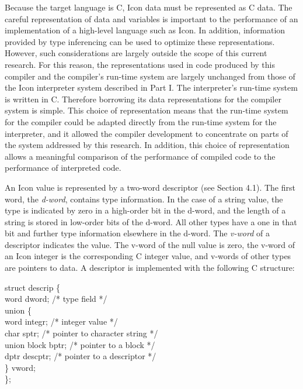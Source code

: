 Because the target language is C, Icon data must be represented as C
data. The careful representation of data and variables is important to
the performance of an implementation of a high-level language such as
Icon. In addition, information provided by type inferencing can be
used to optimize these representations. However, such considerations
are largely outside the scope of this current research. For this
reason, the representations used in code produced by this compiler and
the compiler's run-time system are largely unchanged from those of the
Icon interpreter system described in Part I. The interpreter's
run-time system is written in C. Therefore borrowing its data
representations for the compiler system is simple. This choice of
representation means that the run-time system for the compiler could
be adapted directly from the run-time system for the interpreter, and
it allowed the compiler development to concentrate on parts of the
system addressed by this research. In addition, this choice of
representation allows a meaningful comparison of the performance of
compiled code to the performance of interpreted code.


An Icon value is represented by a two-word descriptor (see Section
4.1). The first word, the \textit{d-word}, contains type
information. In the case of a string value, the type is indicated by
zero in a high-order bit in the d-word, and the length of a string is
stored in low-order bits of the d-word. All other types have a one in
that bit and further type information elsewhere in the d-word. The
\textit{v-word} of a descriptor indicates the value. The v-word of the
null value is zero, the v-word of an Icon integer is the corresponding
C integer value, and v-words of other types are pointers to data. A
descriptor is implemented with the following C structure:

\goodbreak
\begin{iconcode}
struct descrip \{\\
\>word dword; /* type field */\\
\>union \{\\
\>\>word integr; /* integer value */\\
\>\>char sptr; /* pointer to character string */\\
\>\>union block bptr; /* pointer to a block */\\
\>\>dptr descptr; /* pointer to a descriptor */\\
\>\} vword;\\
\};\\
\end{iconcode}

